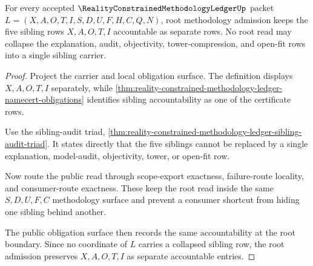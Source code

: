 \begin{theorem}
\label{thm:reality-constrained-methodology-ledger-root-sibling-accountability}
For every accepted $\RealityConstrainedMethodologyLedgerUp$ packet
$L=(X,A,O,T,I,S,D,U,F,H,C,Q,N)$, root methodology admission keeps the five
sibling rows $X,A,O,T,I$ accountable as separate rows. No root read may collapse
the explanation, audit, objectivity, tower-compression, and open-fit rows into a
single sibling carrier.
\end{theorem}
\begin{proof}
Project the carrier and local obligation surface. The definition displays
$X,A,O,T,I$ separately, while
\autoref{thm:reality-constrained-methodology-ledger-namecert-obligations}
identifies sibling accountability as one of the certificate rows.

Use the sibling-audit triad,
\autoref{thm:reality-constrained-methodology-ledger-sibling-audit-triad}. It
states directly that the five siblings cannot be replaced by a single
explanation, model-audit, objectivity, tower, or open-fit row.

Now route the public read through scope-export exactness, failure-route
locality, and consumer-route exactness. These keep the root read inside the
same $S,D,U,F,C$ methodology surface and prevent a consumer shortcut from hiding
one sibling behind another.

The public obligation surface then records the same accountability at the root
boundary. Since no coordinate of $L$ carries a collapsed sibling row, the root
admission preserves $X,A,O,T,I$ as separate accountable entries.
\end{proof}

